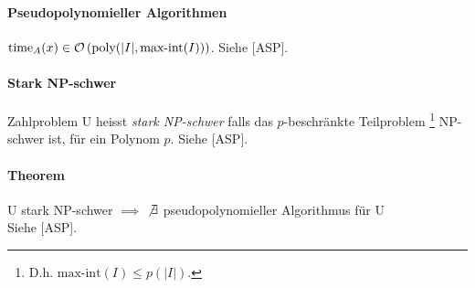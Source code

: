 \paragraph{Pseudopolynomieller Algorithmen}
$\text{time}_A(x) \in \mathcal{O} \left( \text{poly}( |I|, \text{max-int}(I) ) \right)$.
Siehe [ASP].

\paragraph{Stark NP-schwer}
Zahlproblem U heisst \emph{stark NP-schwer} falls das $p$-beschränkte Teilproblem%
\footnote{D.h. $\text{max-int}(I) \leq p(|I|)$.} NP-schwer ist, für ein Polynom $p$.
Siehe [ASP].

\paragraph{Theorem}
U stark NP-schwer $\implies$ $\not \exists$ pseudopolynomieller Algorithmus für U\\
Siehe [ASP].
